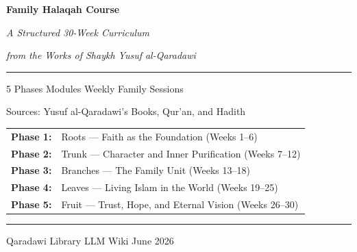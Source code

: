 \documentclass[11pt,a4paper]{article}
\renewcommand{\normalcolor}{\color{textlight}}
\begin{document}
\pagecolor{bgdark}
\color{textlight}
\normalcolor


\begin{titlepage}
\thispagestyle{empty}

\vspace*{3cm}
\begin{center}
{\fontsize{28}{34}\selectfont\bfseries\color{gold} Family Halaqah Course\par}
\vspace{12pt}
{\fontsize{14}{18}\selectfont\color{accent2}\itshape A Structured 30-Week Curriculum\par}
\vspace{6pt}
{\fontsize{14}{18}\selectfont\color{accent2}\itshape from the Works of Shaykh Yusuf al-Qaradawi\par}
\vspace{24pt}
{\color{border}\rule{8cm}{0.8pt}}
\vspace{24pt}

{\fontsize{12}{16}\selectfont\color{textlight} 5 Phases \quad\textbullet{} Modules \quad\textbullet\quad Weekly Family Sessions\par}
\vspace{6pt}
{\fontsize{11}{14}\selectfont\color{textmuted} Sources: Yusuf al-Qaradawi's Books, Qur'an, and Hadith\par}
\vspace{36pt}

{\fontsize{11}{14}\selectfont\color{textlight}
\begin{tabular}{rl}
\color{accent}\textbf{Phase 1:} & \color{textlight}Roots --- Faith as the Foundation (Weeks 1--6) \\
\color{accent}\textbf{Phase 2:} & \color{textlight}Trunk --- Character and Inner Purification (Weeks 7--12) \\
\color{accent}\textbf{Phase 3:} & \color{textlight}Branches --- The Family Unit (Weeks 13--18) \\
\color{accent}\textbf{Phase 4:} & \color{textlight}Leaves --- Living Islam in the World (Weeks 19--25) \\
\color{accent}\textbf{Phase 5:} & \color{textlight}Fruit --- Trust, Hope, and Eternal Vision (Weeks 26--30) \\
\end{tabular}\par}

\vfill
{\color{border}\rule{12cm}{0.4pt}}
\vspace{8pt}
{\fontsize{10}{12}\selectfont\color{textmuted} Qaradawi Library LLM Wiki \quad\textbullet\quad June 2026\par}
\end{center}
\end{titlepage}
\end{document}
